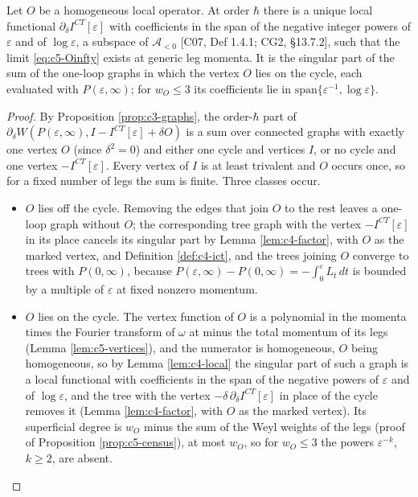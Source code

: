 \begin{proposition}
\label{prop:c5-thmB}
Let $O$ be a homogeneous local operator. At order $\hbar$ there is a unique local functional $\partial_\delta I^{CT}[\varepsilon]$ with coefficients in the span of the negative integer powers of $\varepsilon$ and of $\log\varepsilon$, a subspace of $\mathscr A_{<0}$ [C07, Def 1.4.1; CG2, §13.7.2], such that the limit \eqref{eq:c5-Oinfty} exists at generic leg momenta. It is the singular part of the sum of the one-loop graphs in which the vertex $O$ lies on the cycle, each evaluated with $P(\varepsilon,\infty)$; for $w_O\le3$ its coefficients lie in $\mathrm{span}\{\varepsilon^{-1},\log\varepsilon\}$.
\end{proposition}

\begin{proof}
By Proposition \ref{prop:c3-graphs}, the order-$\hbar$ part of $\partial_\delta W(P(\varepsilon,\infty),I-I^{CT}[\varepsilon]+\delta O)$ is a sum over connected graphs with exactly one vertex $O$ (since $\delta^2=0$) and either one cycle and vertices $I$, or no cycle and one vertex $-I^{CT}[\varepsilon]$. Every vertex of $I$ is at least trivalent and $O$ occurs once, so for a fixed number of legs the sum is finite. Three classes occur.
\begin{itemize}
\item $O$ lies off the cycle. Removing the edges that join $O$ to the rest leaves a one-loop graph without $O$; the corresponding tree graph with the vertex $-I^{CT}[\varepsilon]$ in its place cancels its singular part by Lemma \ref{lem:c4-factor}, with $O$ as the marked vertex, and Definition \ref{def:c4-ict}, and the trees joining $O$ converge to trees with $P(0,\infty)$, because $P(\varepsilon,\infty)-P(0,\infty)=-\int_0^\varepsilon L_t\,dt$ is bounded by a multiple of $\varepsilon$ at fixed nonzero momentum.
\item $O$ lies on the cycle. The vertex function of $O$ is a polynomial in the momenta times the Fourier transform of $\omega$ at minus the total momentum of its legs (Lemma \ref{lem:c5-vertices}), and the numerator is homogeneous, $O$ being homogeneous, so by Lemma \ref{lem:c4-local} the singular part of such a graph is a local functional with coefficients in the span of the negative powers of $\varepsilon$ and of $\log\varepsilon$, and the tree with the vertex $-\delta\,\partial_\delta I^{CT}[\varepsilon]$ in place of the cycle removes it (Lemma \ref{lem:c4-factor}, with $O$ as the marked vertex). Its superficial degree is $w_O$ minus the sum of the Weyl weights of the legs (proof of Proposition \ref{prop:c5-census}), at most $w_O$, so for $w_O\le3$ the powers $\varepsilon^{-k}$, $k\ge2$, are absent.

\end{itemize}
\end{proof}
